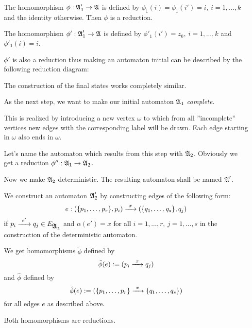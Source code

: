 \begin{center}

\end{center}

The homomorphism $\phi : \mbox{$\mathfrak{A}$}'_1 \to \mbox{$\mathfrak{A}$}$ is defined by $\phi_1(i) =
\phi_1(i') = i,\ i = 1, \ldots, k$ and the identity otherwise. Then $\phi$ is a
reduction.

The homomorphism $\phi' : \mbox{$\mathfrak{A}$}_1' \to \mbox{$\mathfrak{A}$}$ is defined by $\phi'_1(i') =
z_0,\ i = 1, \ldots, k$ and $\phi'_1(i) = i$. 

$\phi'$ is also a reduction thus making an automaton initial can be
described by the following reduction diagram:

\begin{center}
\end{center}

The construction of the final states works completely similar.

As the next step, we want to make our initial automaton $\mbox{$\mathfrak{A}$}_1$ {\em
complete}.

This is realized by introducing a new vertex $\omega$ to which from all
''incomplete'' vertices new edges with the corresponding label will be drawn.
Each edge starting in $\omega$ also ends in $\omega$.

Let's name the automaton which results from this step with $\mbox{$\mathfrak{A}$}_2$. Obviously
we get a reduction $\phi'' : \mbox{$\mathfrak{A}$}_1 \to \mbox{$\mathfrak{A}$}_2$.

\bigskip
Now we make $\mbox{$\mathfrak{A}$}_2$ deterministic. The resulting automaton shall be named
$\mbox{$\mathfrak{A}$}'$.

We construct an automaton $\mbox{$\mathfrak{A}$}_2'$ by constructing edges of the following
form:
\[ e : (\mbox{$\{p_1, \ldots, p_r\}$}, p_i) \xrightarrow{\ {x}\ } (\mbox{$\{q_1, \ldots, q_s\}$},
q_j) \] if $p_i \xrightarrow{\ {e'}\ } q_j \in E_{\mbox{$\mathfrak{A_2}$}}$ and $\alpha(e') = x$ for all $i = 1,
\ldots,r,\ j = 1, \ldots, s$ in the construction of the deterministic automaton.

We get homomorphisms $ \tilde{\phi}$ defined by
\[ \tilde{\phi}(e) := (p_i \xrightarrow{\ {x}\ } q_j) \]
and $\hat{\phi}$ defined by
\[ \hat{\phi}(e) := (\mbox{$\{p_1, \ldots, p_r\}$} \xrightarrow{\ {x}\ } \mbox{$\{q_1, \ldots, q_s\}$})
\]
for all edges $e$ as described above.

Both homomorphisms are reductions.

